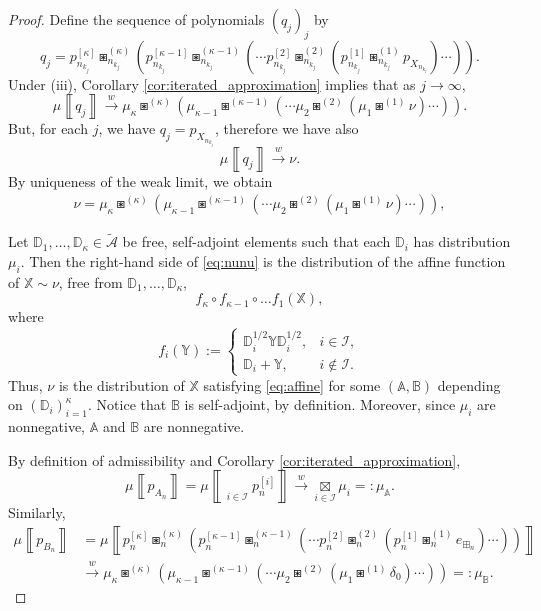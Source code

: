 \documentclass[a4paper,11pt]{amsart}
\numberwithin{equation}{section}
\newcommand{\weak}{\xrightarrow{w}}
\def \X {{\mathbb X}}
\def \Y {{\mathbb Y}}
\def \A {{\mathbb A}}
\def \B {{\mathbb B}}
\newcommand{\meas}[1]{\mu\! \left\llbracket #1 \right\rrbracket}
\begin{document}
\begin{proof}
Define the sequence of polynomials $(q_j)_j$ by
\[
q_j = p_{n_{k_j}}^{[\kappa]}\boxast_{n_{k_j}}^{(\kappa)} \left( p_{n_{k_j}}^{[\kappa-1]}\boxast_{n_{k_j}}^{(\kappa-1)}\left(\cdots p_{n_{k_j}}^{[2]}\boxast_{n_{k_j}}^{(2)}\left( p_{n_{k_j}}^{[1]}\boxast_{n_{k_j}}^{(1)} p_{X_{n_{k_j}}}\right)\cdots \right)\right).
\]
Under (iii), Corollary  \ref{cor:iterated_approximation} implies that as $j\to\infty$,
\[
\meas{q_j} \weak \mu_\kappa\boxast^{(\kappa)} \left( \mu_{\kappa-1}\boxast^{(\kappa-1)}\left(\cdots \mu_2 \boxast^{(2)}\left( \mu_1\boxast^{(1)} \nu\right)\cdots \right)\right).
\]
But, for each $j$, we have $q_j=p_{X_{n_{k_j}}}$, therefore we have also 
\[
\meas{q_j}\weak \nu.
\]
By uniqueness of the weak limit, we obtain 
\begin{align}\label{eq:nunu}
\nu =  \mu_\kappa\boxast^{(\kappa)} \left( \mu_{\kappa-1}\boxast^{(\kappa-1)}\left(\cdots \mu_2 \boxast^{(2)}\left( \mu_1\boxast^{(1)} \nu\right)\cdots \right)\right),
\end{align}

Let $\mathbb{D}_1, \dots, \mathbb{D}_\kappa \in \tilde{\mathcal{A}}$ be free, self-adjoint elements such that each $\mathbb{D}_i$ has distribution $\mu_i$. Then the right-hand side of \eqref{eq:nunu} is the distribution of the affine function of $\X\sim\nu$, free from $\mathbb{D}_{1},\dots,\mathbb{D}_{\kappa}$,
    \[
    f_\kappa\circ f_{\kappa-1}\circ\ldots f_1(\X),
    \]
    where 
    \[
    f_i(\Y) := \begin{cases}
      \mathbb{D}_i^{1/2} \Y \mathbb{D}_i^{1/2}  , & i\in \mathcal{I},\\
       \mathbb{D}_i+ \Y, & i\notin \mathcal{I}.
    \end{cases}
    \]
    Thus, $\nu$ is the distribution of $\X$ satisfying \eqref{eq:affine} for some $(\A,\B)$ depending on $(\mathbb{D}_i)_{i=1}^\kappa$. Notice that $\B$ is self-adjoint, by definition. Moreover, since $\mu_i$ are nonnegative, $\A$ and $\B$ are nonnegative.

By definition of admissibility and Corollary \ref{cor:iterated_approximation}, 
\[
\meas{p_{A_n}}=\meas{\mathop{\boxtimes_n}\limits_{i\in \mathcal I}p_n^{[i]}} \weak \mathop{\boxtimes}\limits_{i\in \mathcal I}\mu_i = :\mu_\A.
\]
Similarly,
\begin{equation*}
\begin{aligned}
\meas{p_{B_n}} 
&= \meas{ p_{n}^{[\kappa]}\boxast_n^{(\kappa)} \left( p_{n}^{[\kappa-1]}\boxast_n^{(\kappa-1)}\left(\cdots p_n^{[2]}\boxast_n^{(2)}\left( p_{n}^{[1]}\boxast_n^{(1)} e_{\boxplus_n}\right)\cdots \right)\right) } \\[1ex]
&\weak \mu_\kappa\boxast^{(\kappa)} \left( \mu_{\kappa-1}\boxast^{(\kappa-1)}\left(\cdots \mu_2 \boxast^{(2)}\left( \mu_1\boxast^{(1)} \delta_0\right)\cdots \right)\right)=:\mu_\B.
\end{aligned}
\end{equation*}


\end{proof}
\end{document}
